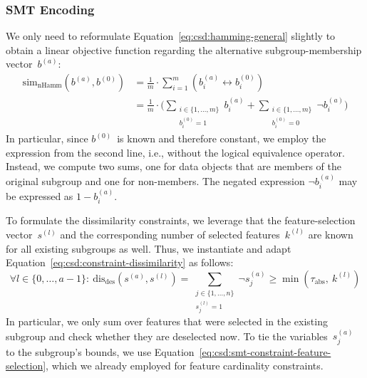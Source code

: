 \documentclass{article}
\theoremstyle{definition}
\begin{document}
\subsubsection{SMT Encoding}
\label{sec:csd:approach:alternatives:smt}

We only need to reformulate Equation~\ref{eq:csd:hamming-general} slightly to obtain a linear objective function regarding the alternative subgroup-membership vector~$b^{(a)}$:
%
\begin{equation}
	\begin{aligned}
		\text{sim}_{\text{nHamm}}(b^{(a)}, b^{(0)}) &= \frac{1}{m} \cdot \sum_{i=1}^m \left( b_i^{(a)} \leftrightarrow b_i^{(0)} \right) \\
		&= \frac{1}{m} \cdot \Big( \sum\limits_{\substack{i \in \{1, \dots, m\} \\ b_i^{(0)} = 1}} b_i^{(a)} + \sum\limits_{\substack{i \in \{1, \dots, m\} \\ b_i^{(0)} = 0}} \lnot b_i^{(a)} \Big)
	\end{aligned}
	\label{eq:csd:smt-hamming}
\end{equation}
%
In particular, since $b^{(0)}$~is known and therefore constant, we employ the expression from the second line, i.e., without the logical equivalence operator.
Instead, we compute two sums, one for data objects that are members of the original subgroup and one for non-members.
The negated expression $\lnot b_i^{(a)}$ may be expressed as $1 - b_i^{(a)}$.

To formulate the dissimilarity constraints, we leverage that the feature-selection vector~$s^{(l)}$ and the corresponding number of selected features~$k^{(l)}$ are known for all existing subgroups as well.
Thus, we instantiate and adapt Equation~\ref{eq:csd:constraint-dissimilarity} as follows:
%
\begin{equation}
	\forall l \in \{0, \dots, a-1\}:~ \text{dis}_{\text{des}}(s^{(a)}, s^{(l)}) = \sum_{\substack{j \in \{1, \dots, n\} \\ s^{(l)}_j = 1}} \lnot s^{(a)}_j \geq \min \left( \tau_{\text{abs}},~k^{(l)} \right)
	\label{eq:csd:smt-constraint-dissimilarity}
\end{equation}
%
In particular, we only sum over features that were selected in the existing subgroup and check whether they are deselected now.
To tie the variables~$s^{(a)}_j$ to the subgroup's bounds, we use Equation~\ref{eq:csd:smt-constraint-feature-selection}, which we already employed for feature cardinality constraints.
\end{document}
